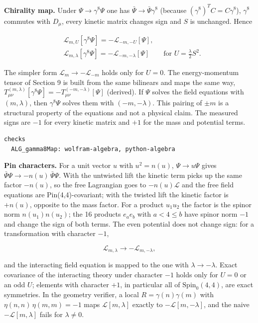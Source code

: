 \documentclass[11pt]{article}
\begin{document}
\textbf{Chirality map.} Under $\Psi\to\gamma^8\Psi$ one has $\bar\Psi\to\bar\Psi\gamma^8$ (because $(\gamma^8)^TC=C\gamma^8$), $\gamma^8$ commutes with $D_\mu$, every kinetic matrix changes sign and $S$ is unchanged. Hence

\[
\begin{aligned}
&\mathcal L_{m,U}[\gamma^8\Psi]=-\mathcal L_{-m,-U}[\Psi],\\
&\mathcal L_{m,\lambda}[\gamma^8\Psi]=-\mathcal L_{-m,-\lambda}[\Psi]\qquad\text{for }U=\tfrac\lambda2S^2 .
\end{aligned}
\]

The simpler form $\mathcal L_m\to-\mathcal L_{-m}$ holds only for $U=0$. The energy-momentum tensor of Section 9 is built from the same bilinears and maps the same way, $T^{(m,\lambda)}_{\mu\nu}[\gamma^8\Psi]=-T^{(-m,-\lambda)}_{\mu\nu}[\Psi]$ (derived). If $\Psi$ solves the field equations with $(m,\lambda)$, then $\gamma^8\Psi$ solves them with $(-m,-\lambda)$. This pairing of $\pm m$ is a structural property of the equations and not a physical claim. The measured signs are $-1$ for every kinetic matrix and $+1$ for the mass and potential terms.

\begin{Verbatim}[fontsize=\small]
checks
  ALG_gamma8Map: wolfram-algebra, python-algebra
\end{Verbatim}

\textbf{Pin characters.} For a unit vector $u$ with $u^2=n(u)$, $\Psi\to u\Psi$ gives $\bar\Psi\Psi\to-n(u)\,\bar\Psi\Psi$. With the untwisted lift the kinetic term picks up the same factor $-n(u)$, so the free Lagrangian goes to $-n(u)\mathcal L$ and the free field equations are Pin(4,4)-covariant; with the twisted lift the kinetic factor is $+n(u)$, opposite to the mass factor. For a product $u_1u_2$ the factor is the spinor norm $n(u_1)n(u_2)$; the 16 products $e_ae_b$ with $a<4\le b$ have spinor norm $-1$ and change the sign of both terms. The even potential does not change sign: for a transformation with character $-1$,

\[
\mathcal L_{m,\lambda}\to-\mathcal L_{m,-\lambda},
\]

and the interacting field equation is mapped to the one with $\lambda\to-\lambda$. Exact covariance of the interacting theory under character $-1$ holds only for $U=0$ or an odd $U$; elements with character $+1$, in particular all of $\mathrm{Spin}_0(4,4)$, are exact symmetries. In the geometry verifier, a local $R=\gamma(n)\gamma(m)$ with $\eta(n,n)\,\eta(m,m)=-1$ maps $\mathcal L[m,\lambda]$ exactly to $-\mathcal L[m,-\lambda]$, and the naive $-\mathcal L[m,\lambda]$ fails for $\lambda\ne0$.
\end{document}

